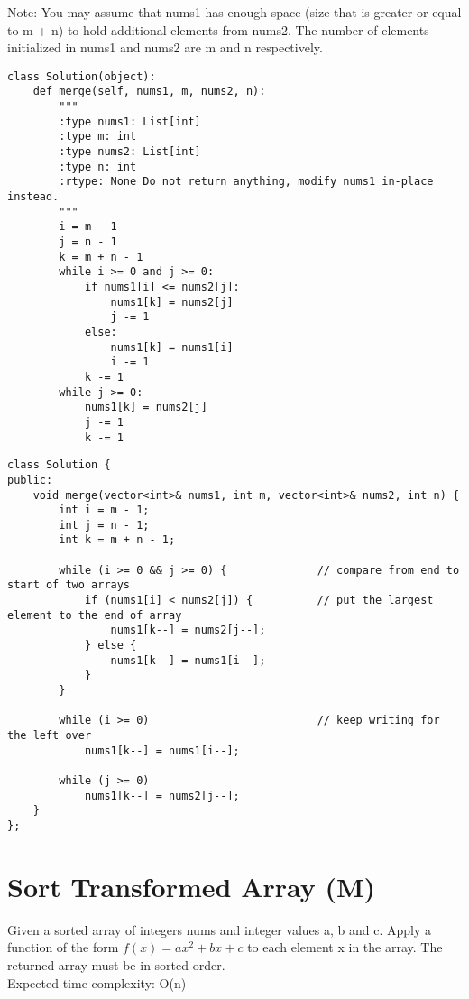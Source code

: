 Note: You may assume that nums1 has enough space (size that is greater or equal to m + n) to hold additional elements from nums2. The number of elements initialized in nums1 and nums2 are m and n respectively.\\

\begin{lstlisting}
class Solution(object):
    def merge(self, nums1, m, nums2, n):
        """
        :type nums1: List[int]
        :type m: int
        :type nums2: List[int]
        :type n: int
        :rtype: None Do not return anything, modify nums1 in-place instead.
        """
        i = m - 1
        j = n - 1
        k = m + n - 1
        while i >= 0 and j >= 0:
            if nums1[i] <= nums2[j]:
                nums1[k] = nums2[j]
                j -= 1
            else:
                nums1[k] = nums1[i]
                i -= 1
            k -= 1
        while j >= 0:
            nums1[k] = nums2[j]
            j -= 1
            k -= 1
\end{lstlisting}

\begin{lstlisting}
class Solution {
public:
    void merge(vector<int>& nums1, int m, vector<int>& nums2, int n) {
        int i = m - 1;
        int j = n - 1;
        int k = m + n - 1;
        
        while (i >= 0 && j >= 0) {              // compare from end to start of two arrays
            if (nums1[i] < nums2[j]) {          // put the largest element to the end of array
                nums1[k--] = nums2[j--];
            } else {
                nums1[k--] = nums1[i--];
            }
        }
        
        while (i >= 0)                          // keep writing for the left over
            nums1[k--] = nums1[i--];
            
        while (j >= 0)
            nums1[k--] = nums2[j--];
    }
};
\end{lstlisting}


\section{Sort Transformed Array (M)}
Given a sorted array of integers nums and integer values a, b and c. Apply a function of the form $f(x) = ax^2 + bx + c$ to each element x in the array. The returned array must be in sorted order.\\

Expected time complexity: O(n)\\


